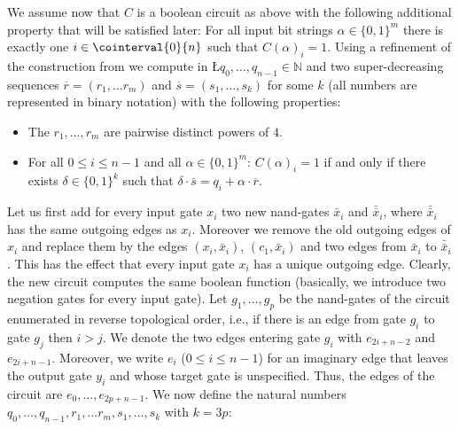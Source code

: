 We assume now that $C$ is a boolean circuit as above with the 
 following additional property that will be satisfied later: For all input bit strings $\alpha \in \{0,1\}^m$ there is exactly
one $i \in \cointerval{0}{n}$ such that $C(\alpha)_i=1$. Using a refinement of the construction from \cite{ref30}
we compute in \L $q_{0}, \ldots, q_{n-1} \in \mathbb{N}$ and two super-decreasing sequences 
$\overline{r} = (r_1, \ldots r_m)$ and $\overline{s} = (s_1, \ldots, s_k)$ for some $k$ (all numbers are represented in binary notation) with the following properties:
\begin{itemize}
\item The $r_1, \ldots, r_m$ are pairwise distinct powers of $4$. 
\item For all $0 \leq i \leq n-1$ and all $\alpha \in \{0,1\}^m$:
$C(\alpha)_i = 1$  if and only if there exists
$\delta \in \{0,1\}^k$ such that $\delta \cdot \overline{s} = q_i + \alpha \cdot \overline{r}$. 
\end{itemize}
Let us first add for every input gate $x_i$ two new {\sf nand}-gates
${\bar x}_i$ and ${\bar{\bar x}}_i$, where ${\bar{\bar x}}_i$ has the same outgoing edges as $x_i$. Moreover we remove the old outgoing edges of $x_i$
and replace them by the edges $(x_i, {\bar x}_i)$, $(c_1, {\bar x}_i)$ and two edges from ${\bar x}_i$ to ${\bar{\bar x}}_i$.
This has the effect that every input gate $x_i$ has a unique outgoing edge. Clearly, the new circuit computes the same
boolean function (basically, we introduce two negation gates for every input gate).
Let $g_1, \ldots, g_p$ be the {\sf nand}-gates of the circuit enumerated in reverse topological
order, i.e., if there is an edge from gate $g_i$ to gate $g_j$ then $i>j$. We denote the two edges entering gate
$g_i$ with $e_{2i+n-2}$ and $e_{2i+n-1}$. Moreover, we write $e_i$ ($0 \leq i \leq n-1$) for an imaginary edge
that leaves the output gate $y_{i}$ and whose target gate is unspecified. Thus, the edges of the circuit are 
$e_0,\ldots, e_{2p+n-1}$.
We now define the natural numbers $q_{0}, \ldots, q_{n-1}, r_1, \ldots r_m,s_1, \ldots, s_k$ with $k = 3p$:
